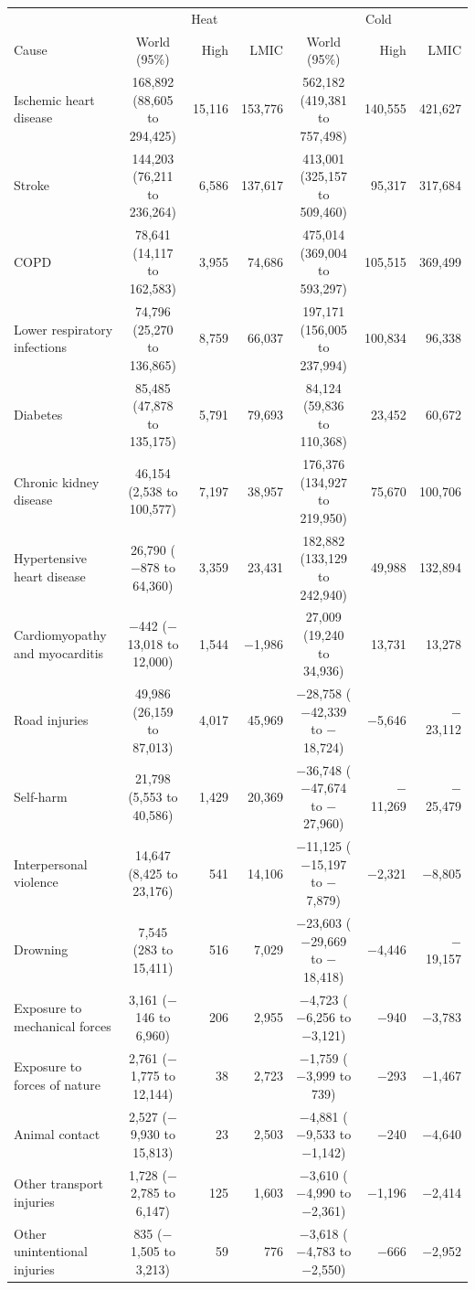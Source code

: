 \begin{tabular}{lcrrcrr}
\toprule
& \multicolumn{3}{c}{Heat} & \multicolumn{3}{c}{Cold} \\ Cause & World (95\%) & High & LMIC & World (95\%) & High & LMIC \\
\midrule
Ischemic heart disease & 168,892 (88,605 to 294,425) & 15,116 & 153,776 & 562,182 (419,381 to 757,498) & 140,555 & 421,627 \\
Stroke & 144,203 (76,211 to 236,264) & 6,586 & 137,617 & 413,001 (325,157 to 509,460) & 95,317 & 317,684 \\
COPD & 78,641 (14,117 to 162,583) & 3,955 & 74,686 & 475,014 (369,004 to 593,297) & 105,515 & 369,499 \\
Lower respiratory infections & 74,796 (25,270 to 136,865) & 8,759 & 66,037 & 197,171 (156,005 to 237,994) & 100,834 & 96,338 \\
Diabetes & 85,485 (47,878 to 135,175) & 5,791 & 79,693 & 84,124 (59,836 to 110,368) & 23,452 & 60,672 \\
Chronic kidney disease & 46,154 (2,538 to 100,577) & 7,197 & 38,957 & 176,376 (134,927 to 219,950) & 75,670 & 100,706 \\
Hypertensive heart disease & 26,790 ($-$878 to 64,360) & 3,359 & 23,431 & 182,882 (133,129 to 242,940) & 49,988 & 132,894 \\
Cardiomyopathy and myocarditis & $-$442 ($-$13,018 to 12,000) & 1,544 & $-$1,986 & 27,009 (19,240 to 34,936) & 13,731 & 13,278 \\
Road injuries & 49,986 (26,159 to 87,013) & 4,017 & 45,969 & $-$28,758 ($-$42,339 to $-$18,724) & $-$5,646 & $-$23,112 \\
Self-harm & 21,798 (5,553 to 40,586) & 1,429 & 20,369 & $-$36,748 ($-$47,674 to $-$27,960) & $-$11,269 & $-$25,479 \\
Interpersonal violence & 14,647 (8,425 to 23,176) & 541 & 14,106 & $-$11,125 ($-$15,197 to $-$7,879) & $-$2,321 & $-$8,805 \\
Drowning & 7,545 (283 to 15,411) & 516 & 7,029 & $-$23,603 ($-$29,669 to $-$18,418) & $-$4,446 & $-$19,157 \\
Exposure to mechanical forces & 3,161 ($-$146 to 6,960) & 206 & 2,955 & $-$4,723 ($-$6,256 to $-$3,121) & $-$940 & $-$3,783 \\
Exposure to forces of nature & 2,761 ($-$1,775 to 12,144) & 38 & 2,723 & $-$1,759 ($-$3,999 to 739) & $-$293 & $-$1,467 \\
Animal contact & 2,527 ($-$9,930 to 15,813) & 23 & 2,503 & $-$4,881 ($-$9,533 to $-$1,142) & $-$240 & $-$4,640 \\
Other transport injuries & 1,728 ($-$2,785 to 6,147) & 125 & 1,603 & $-$3,610 ($-$4,990 to $-$2,361) & $-$1,196 & $-$2,414 \\
Other unintentional injuries & 835 ($-$1,505 to 3,213) & 59 & 776 & $-$3,618 ($-$4,783 to $-$2,550) & $-$666 & $-$2,952 \\
\bottomrule
\end{tabular}
